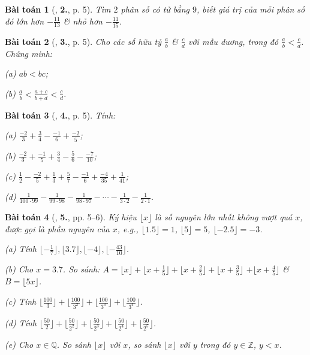 \documentclass{article}
\numberwithin{equation}{section}
\newtheorem{baitoan}{Bài toán}[section]
\begin{document}
\begin{baitoan}[\cite{Binh_Toan_7_tap_1}, \textbf{2.}, p. 5]
	Tìm $2$ phân số có tử bằng $9$, biết giá trị của mỗi phân số đó lớn hơn $-\frac{11}{13}$ \& nhỏ hơn $-\frac{11}{15}$.
\end{baitoan}

\begin{baitoan}[\cite{Binh_Toan_7_tap_1}, \textbf{3.}, p. 5]
	Cho các số hữu tỷ $\frac{a}{b}$ \& $\frac{c}{d}$ với mẫu dương, trong đó $\frac{a}{b} < \frac{c}{d}$. Chứng minh:
	\begin{enumerate*}
		\item[(a)] $ab < bc$;
		\item[(b)] $\frac{a}{b} < \frac{a + c}{b + d} < \frac{c}{d}$.
	\end{enumerate*}
\end{baitoan}

\begin{baitoan}[\cite{Binh_Toan_7_tap_1}, \textbf{4.}, p. 5]
	Tính:
	\begin{enumerate*}
		\item[(a)] $\frac{-2}{3} + \frac{3}{4} - \frac{-1}{6} + \frac{-2}{5}$;
		\item[(b)] $\frac{-2}{3} + \frac{-1}{5} + \frac{3}{4} - \frac{5}{6} - \frac{-7}{10}$;
		\item[(c)] $\frac{1}{2} - \frac{-2}{5} + \frac{1}{3} + \frac{5}{7} - \frac{-1}{6} + \frac{-4}{35} + \frac{1}{41}$;
		\item[(d)] $\frac{1}{100\cdot 99} - \frac{1}{99\cdot 98} - \frac{1}{98\cdot 97} - \cdots - \frac{1}{3\cdot 2} - \frac{1}{2\cdot 1}$.
	\end{enumerate*}
\end{baitoan}

\begin{baitoan}[\cite{Binh_Toan_7_tap_1}, \textbf{5.}, pp. 5--6]
	Ký hiệu $\lfloor x\rfloor$ là số nguyên lớn nhất không vượt quá $x$, được gọi là \emph{phần nguyên} của $x$, e.g., $\lfloor 1.5\rfloor = 1$, $\lfloor 5\rfloor = 5$, $\lfloor -2.5\rfloor = -3$.
	\begin{enumerate*}
		\item[(a)] Tính $\lfloor-\frac{1}{7}\rfloor,\lfloor 3.7\rfloor,\lfloor-4\rfloor,\lfloor-\frac{43}{10}\rfloor$.
		\item[(b)] Cho $x = 3.7$. So sánh: $A = \lfloor x\rfloor + \lfloor x + \frac{1}{5}\rfloor + \lfloor x + \frac{2}{5}\rfloor + \lfloor x + \frac{3}{5}\rfloor$ $+ \lfloor x + \frac{4}{5}\rfloor$ \& $B = \lfloor 5x\rfloor$.
		\item[(c)] Tính $ \lfloor\frac{100}{3}\rfloor + \lfloor\frac{100}{3^2}\rfloor + \lfloor\frac{100}{3^3}\rfloor + \lfloor\frac{100}{3^4}\rfloor$.
		\item[(d)] Tính $ \lfloor\frac{50}{2}\rfloor + \lfloor\frac{50}{2^2}\rfloor + \lfloor\frac{50}{2^3}\rfloor + \lfloor\frac{50}{2^4}\rfloor + \lfloor\frac{50}{2^5}\rfloor$.
		\item[(e)] Cho $x\in\mathbb{Q}$. So sánh $\lfloor x\rfloor$ với $x$, so sánh $\lfloor x\rfloor$ với $y$ trong đó $y\in\mathbb{Z}$, $y < x$.
	\end{enumerate*}
\end{baitoan}
\end{document}
